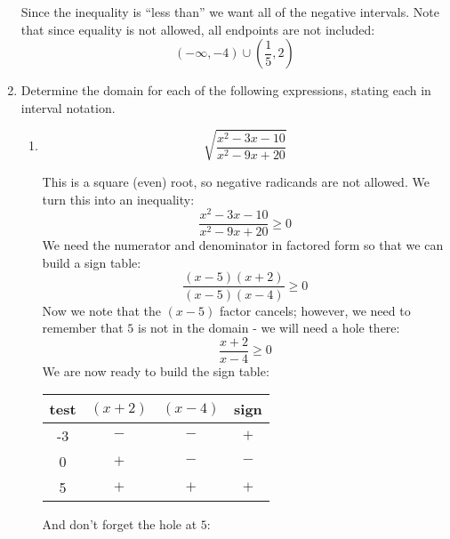 \documentclass[letterpaper,12pt,fleqn]{article}
\begin{document}
\begin{enumerate}
    
  \bigskip

  Since the inequality is ``less than'' we want all of the negative intervals.
  Note that since equality is not allowed, all endpoints are not included:
  \[(-\infty,-4)\cup\left(\frac{1}{5},2\right)\]

\item Determine the domain for each of the following expressions, stating each
  in interval notation.
  \begin{enumerate}
  \item \[\sqrt{\frac{x^2-3x-10}{x^2-9x+20}}\]

    This is a square (even) root, so negative radicands are not allowed. We
    turn this into an inequality:
    \[\frac{x^2-3x-10}{x^2-9x+20}\ge0\]
    We need the numerator and denominator in factored form so that we can
    build a sign table:
    \[\frac{(x-5)(x+2)}{(x-5)(x-4)}\ge0\]
    Now we note that the $(x-5)$ factor cancels; however, we need to remember
    that $5$ is not in the domain - we will need a hole there:
    \[\frac{x+2}{x-4}\ge0\]
    We are now ready to build the sign table:

    \begin{tabular}{c|cc|c}
      test & $(x+2)$ & $(x-4)$ & sign \\
      \hline
      -3 & $-$ & $-$ & $+$ \\
      0 & $+$ & $-$ & $-$ \\
      5 & $+$ & $+$ & $+$ \\
    \end{tabular}
    
    \bigskip

    And don't forget the hole at $5$:

    \bigskip


\end{enumerate}
\end{enumerate}
\end{document}
